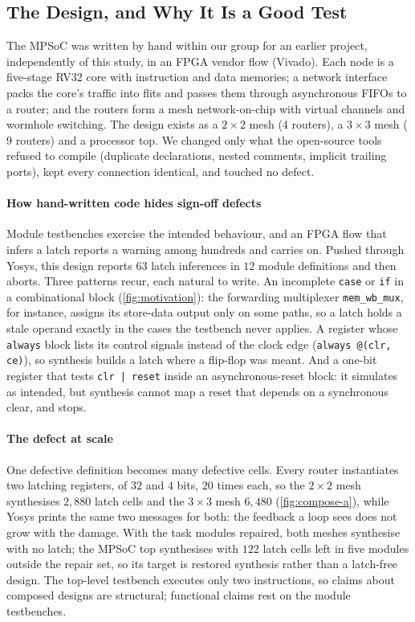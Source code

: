 \documentclass[11pt]{article}
\begin{document}
\subsection{The Design, and Why It Is a Good Test}
\label{sec:mpsoc-design}

The MPSoC was written by hand within our group for an earlier project,
independently of this study, in an FPGA vendor flow (Vivado). Each node is a
five-stage RV32 core with instruction and data memories; a network interface
packs the core's traffic into flits and passes them through asynchronous FIFOs
to a router; and the routers form a mesh network-on-chip with virtual channels
and wormhole switching. The design exists as a $2{\times}2$ mesh ($4$ routers),
a $3{\times}3$ mesh ($9$ routers) and a processor top. We changed only what the
open-source tools refused to compile (duplicate declarations, nested comments,
implicit trailing ports), kept every connection identical, and touched no
defect.

\paragraph{How hand-written code hides sign-off defects} Module testbenches
exercise the intended behaviour, and an FPGA flow that infers a latch reports a
warning among hundreds and carries on. Pushed through Yosys, this design
reports $63$ latch inferences in $12$ module definitions and then aborts. Three
patterns recur, each natural to write. An incomplete \texttt{case} or
\texttt{if} in a combinational block (\cref{fig:motivation}): the forwarding
multiplexer \texttt{mem\_wb\_mux}, for instance, assigns its store-data output
only on some paths, so a latch holds a stale operand exactly in the cases the
testbench never applies. A register whose \texttt{always} block lists its
control signals instead of the clock edge (\texttt{always @(clr, ce)}), so
synthesis builds a latch where a flip-flop was meant. And a one-bit register
that tests \texttt{clr | reset} inside an asynchronous-reset block: it simulates
as intended, but synthesis cannot map a reset that depends on a synchronous
clear, and stops.

\paragraph{The defect at scale} One defective definition becomes many defective
cells. Every router instantiates two latching registers, of $32$ and $4$ bits,
$20$ times each, so the $2{\times}2$ mesh synthesises $2{,}880$ latch cells and
the $3{\times}3$ mesh $6{,}480$ (\cref{fig:compose-a}), while Yosys prints the
same two messages for both: the feedback a loop sees does not grow with the
damage. With the task modules repaired, both meshes synthesise with no latch;
the MPSoC top synthesises with $122$ latch cells left in five modules outside
the repair set, so its target is restored synthesis rather than a latch-free
design. The top-level testbench executes only two instructions, so claims about
composed designs are structural; functional claims rest on the module
testbenches.
\end{document}
